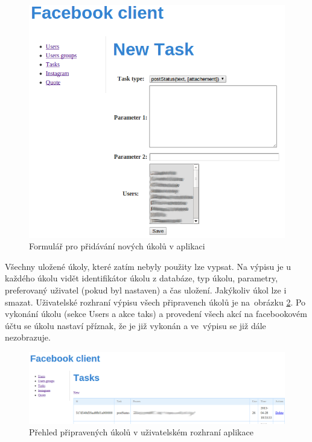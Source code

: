 \documentclass[thesis=M,czech]{FITthesis}[2013/05/10]
\begin{document}
\begin{figure}[h]
\begin{center}
\includegraphics[width=5in]{figures/fcNewTask.png}
\caption{Formulář pro přidávání nových úkolů v aplikaci}
\label{fig:fcNewTask}
\end{center}
\end{figure}

Všechny uložené úkoly, které zatím nebyly použity lze vypsat. Na výpisu je u každého úkolu vidět identifikátor úkolu z databáze, typ úkolu, parametry, preferovaný uživatel (pokud byl nastaven) a čas uložení. Jakýkoliv úkol lze i smazat. Uživatelské rozhraní výpisu všech připravench úkolů je na~obrázku \ref{fig:fcTasks}. Po vykonání úkolu (sekce Users a akce taks) a provedení všech akcí na facebookovém účtu se úkolu nastaví příznak, že je již vykonán a ve~výpisu se již dále nezobrazuje.

\begin{figure}[h]
\begin{center}
\includegraphics[width=5in]{figures/fcTasks.png}
\caption{Přehled připravených úkolů v uživatelském rozhraní aplikace}
\label{fig:fcTasks}
\end{center}
\end{figure}
\end{document}
